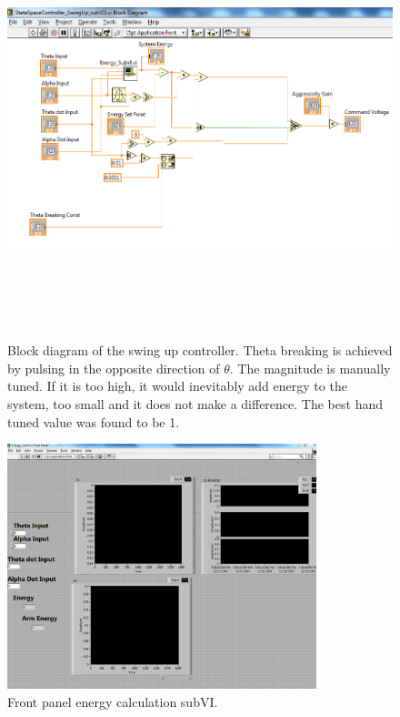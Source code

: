 \documentclass{article}
\theoremstyle{plain}
\theoremstyle{definition}
\theoremstyle{remark}
\begin{document}
\begin{figure}[htb]
\begin{center}
\includegraphics[width = 16cm, height = 12cm]{q6_b4.png}
\end{center}
\caption{Block diagram of the swing up controller. Theta breaking is achieved by pulsing in the opposite direction of $\theta$. The magnitude is manually tuned. If it is too high, it would inevitably add energy to the system, too small and it does not make a difference. The best hand tuned value was found to be 1.}
\label{q6_b4}
\end{figure}


\begin{figure}[htb]
\begin{center}
\includegraphics[width = 9cm]{q6_b5.png}
\end{center}
\caption{Front panel energy calculation subVI.}
\label{q6_b5}
\end{figure}
\end{document}

